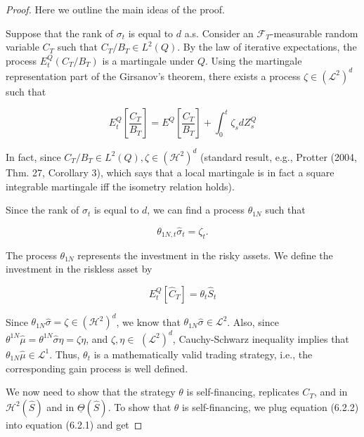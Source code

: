 \documentclass[\topdir/lecture\_notes.tex]{subfiles}
\begin{document}
\begin{proof}
Here we outline the main ideas of the proof.

Suppose that the rank of \(\sigma_{t}\) is equal to \(d\) a.s. Consider an \(\mathcal{F}_{T}\)-measurable random variable \(C_{T}\) such that \(C_{T} / B_{T} \in L^{2}(Q)\). By the law of iterative expectations, the process \(E_{t}^{Q}\left(C_{T} / B_{T}\right)\) is a martingale under \(Q\). Using the martingale representation part of the Girsanov's theorem, there exists a process \(\zeta \in\left(\mathcal{L}^{2}\right)^{d}\) such that

\begin{equation}
E_{t}^{Q}\left[\frac{C_{T}}{B_{T}}\right]=E^{Q}\left[\frac{C_{T}}{B_{T}}\right]+\int_{0}^{t} \zeta_{s} d Z_{s}^{Q} \label{eq:6.2.1}
\end{equation}

In fact, since \(C_{T} / B_{T} \in L^{2}(Q), \zeta \in\left(\mathcal{H}^{2}\right)^{d}\) (standard result, e.g., Protter (2004, Thm. 27, Corollary 3), which says that a local martingale is in fact a square integrable martingale iff the isometry relation holds).

Since the rank of \(\sigma_{t}\) is equal to \(d\), we can find a process \(\theta_{1 N}\) such that

\begin{equation}
\theta_{1 N, t} \hat{\sigma}_{t}=\zeta_{t} . \label{eq:6.2.2}
\end{equation}

The process \(\theta_{1 N}\) represents the investment in the risky assets. We define the investment in the riskless asset by

\begin{equation}
E_{t}^{Q}\left[\hat{C}_{T}\right]=\theta_{t} \hat{S}_{t} \label{eq:6.2.3}
\end{equation}

Since \(\theta_{1 N} \hat{\sigma}=\zeta \in\left(\mathcal{H}^{2}\right)^{d}\), we know that \(\theta_{1 N} \hat{\sigma} \in \mathcal{L}^{2}\). Also, since \(\theta^{1 N} \hat{\mu}=\theta^{1 N} \hat{\sigma} \eta=\zeta \eta\), and \(\zeta, \eta \in\) \(\left(\mathcal{L}^{2}\right)^{d}\), Cauchy-Schwarz inequality implies that \(\theta_{1 N} \hat{\mu} \in \mathcal{L}^{1}\). Thus, \(\theta_{t}\) is a mathematically valid trading strategy, i.e., the corresponding gain process is well defined.

We now need to show that the strategy \(\theta\) is self-financing, replicates \(C_{T}\), and in \(\mathcal{H}^{2}(\hat{S})\) and in \(\underline{\Theta}(\hat{S})\). To show that \(\theta\) is self-financing, we plug equation (6.2.2) into equation (6.2.1) and get


\end{proof}
\end{document}
